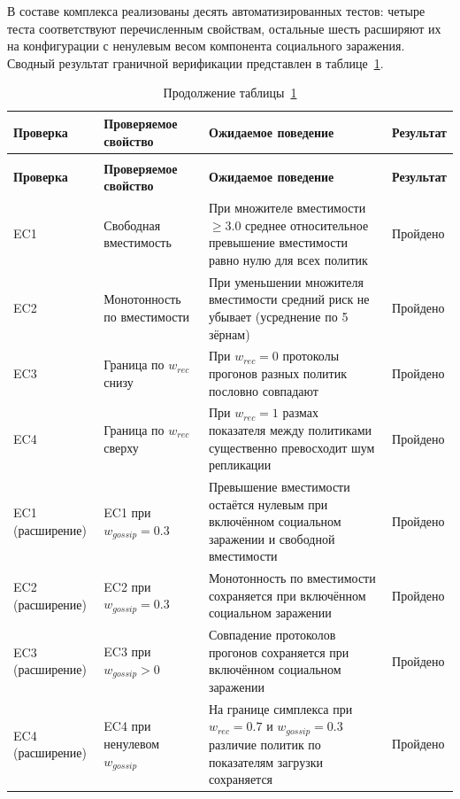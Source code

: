 В составе комплекса реализованы десять автоматизированных тестов: четыре теста соответствуют перечисленным свойствам, остальные шесть расширяют их на конфигурации с ненулевым весом компонента социального заражения. Сводный результат граничной верификации представлен в таблице~\ref{tab:ec-verification}.

\begin{small}
\begin{longtable}{|>{\raggedright\arraybackslash}p{2.7cm}|>{\raggedright\arraybackslash}p{3.7cm}|>{\raggedright\arraybackslash}p{5.7cm}|>{\centering\arraybackslash}p{2.0cm}|}
\caption{Результаты граничной верификации модели}\label{tab:ec-verification}\\
\hline
\textbf{Проверка} & \textbf{Проверяемое свойство} & \textbf{Ожидаемое поведение} & \textbf{Результат} \\
\hline
\endfirsthead
\caption*{Продолжение таблицы~\ref{tab:ec-verification}}\\
\hline
\textbf{Проверка} & \textbf{Проверяемое свойство} & \textbf{Ожидаемое поведение} & \textbf{Результат} \\
\hline
\endhead
\hline
\endfoot
\hline
\endlastfoot
EC1 & Свободная вместимость & При множителе вместимости $\geq 3.0$ среднее относительное превышение вместимости равно нулю для всех политик & Пройдено \\
\hline
EC2 & Монотонность по вместимости & При уменьшении множителя вместимости средний риск не убывает (усреднение по 5 зёрнам) & Пройдено \\
\hline
EC3 & Граница по $w_{rec}$ снизу & При $w_{rec} = 0$ протоколы прогонов разных политик пословно совпадают & Пройдено \\
\hline
EC4 & Граница по $w_{rec}$ сверху & При $w_{rec} = 1$ размах показателя между политиками существенно превосходит шум репликации & Пройдено \\
\hline
EC1 (расширение) & EC1 при $w_{gossip} = 0.3$ & Превышение вместимости остаётся нулевым при включённом социальном заражении и свободной вместимости & Пройдено \\
\hline
EC2 (расширение) & EC2 при $w_{gossip} = 0.3$ & Монотонность по вместимости сохраняется при включённом социальном заражении & Пройдено \\
\hline
EC3 (расширение) & EC3 при $w_{gossip} > 0$ & Совпадение протоколов прогонов сохраняется при включённом социальном заражении & Пройдено \\
\hline
EC4 (расширение) & EC4 при ненулевом $w_{gossip}$ & На границе симплекса при $w_{rec} = 0.7$ и $w_{gossip} = 0.3$ различие политик по показателям загрузки сохраняется & Пройдено \\

\end{longtable}
\end{small}
